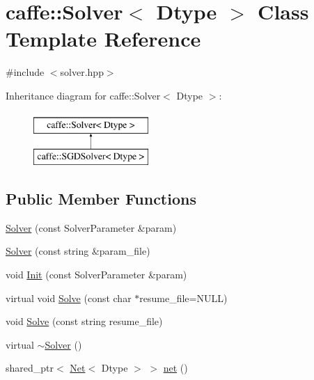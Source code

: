 \hypertarget{classcaffe_1_1_solver}{\section{caffe\+:\+:Solver$<$ Dtype $>$ Class Template Reference}
\label{classcaffe_1_1_solver}
}


{\ttfamily \#include $<$solver.\+hpp$>$}

Inheritance diagram for caffe\+:\+:Solver$<$ Dtype $>$\+:\begin{figure}[H]
\begin{center}
\leavevmode
\includegraphics[height=2.000000cm]{classcaffe_1_1_solver}
\end{center}
\end{figure}
\subsection*{Public Member Functions}
\begin{DoxyCompactItemize}
\item 
\hyperlink{classcaffe_1_1_solver_a153266a021a077d1e4b53819cf558780}{Solver} (const Solver\+Parameter \&param)
\item 
\hyperlink{classcaffe_1_1_solver_a8dea449cb5198e44b1ad975943ec0d64}{Solver} (const string \&param\+\_\+file)
\item 
void \hyperlink{classcaffe_1_1_solver_abf3071597032efde211e5b48cdcb99c5}{Init} (const Solver\+Parameter \&param)
\item 
virtual void \hyperlink{classcaffe_1_1_solver_a20db89c708755c9a1e150df9d0a4b79c}{Solve} (const char $\ast$resume\+\_\+file=N\+U\+L\+L)
\item 
void \hyperlink{classcaffe_1_1_solver_ac0be56a22aebd71d012e751c9e97c7e6}{Solve} (const string resume\+\_\+file)
\item 
virtual \hyperlink{classcaffe_1_1_solver_a4c1f70b043a8718c05e46a11d3abc8ca}{$\sim$\+Solver} ()
\item 
shared\+\_\+ptr$<$ \hyperlink{classcaffe_1_1_net}{Net}$<$ Dtype $>$ $>$ \hyperlink{classcaffe_1_1_solver_aed1d6d3b5d8c3bf43dd33464af0c9de1}{net} ()
\end{DoxyCompactItemize}
